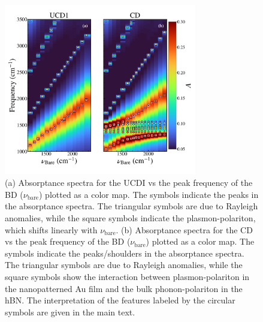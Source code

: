 \documentclass[preprint,
amsmath,amssymb,
aip,
jap,
floatfix,]{revtex4-2}
\begin{document}
			\begin{figure}[!htb]
			  \includegraphics[width=0.75\textwidth]{Figures/Fig3.pdf}
			  \caption{(a) Absorptance spectra for the UCDI vs the peak frequency of the BD ($\nu_\mathrm{bare}$) plotted as a color map. The symbols indicate the peaks in the absorptance spectra. The triangular symbols are due to Rayleigh anomalies, while the square symbols indicate the plasmon-polariton, which shifts linearly with $\nu_\mathrm{bare}$.
			    (b) Absorptance spectra for the CD vs the peak frequency of the BD ($\nu_\mathrm{bare}$) plotted as a color map. The symbols indicate the peaks/shoulders in the absorptance spectra. The triangular symbols are due to Rayleigh anomalies, while the square symbols show the interaction between plasmon-polariton in the nanopatterned Au film and the bulk phonon-polariton in the hBN. The interpretation of the features labeled by the circular symbols are given in the main text.}
			  \label{fig:3}
			\end{figure}
\end{document}
